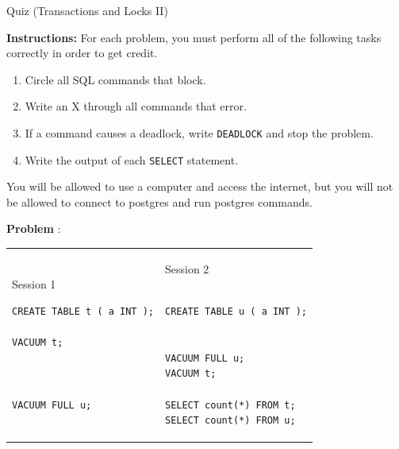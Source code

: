 \documentclass[10pt]{article}
\theoremstyle{definition}
\newcounter{ProblemCounter}
\newcommand{\nextproblem}{\filbreak\stepcounter{ProblemCounter} \noindent\textbf{Problem \theProblemCounter}:}
\begin{document}
\begin{center}
{
\Large
    Quiz (Transactions and Locks II)
}

    \vspace{0.1in}
\end{center}

\noindent
\textbf{Instructions:}
For each problem, you must perform all of the following tasks correctly in order to get credit.
\begin{enumerate}
\item Circle all SQL commands that block.
\item Write an X through all commands that error.
\item If a command causes a deadlock, write \lstinline{DEADLOCK} and stop the problem.
\item Write the output of each \lstinline{SELECT} statement.
\end{enumerate}
    You will be allowed to use a computer and access the internet, but you will not be allowed to connect to postgres and run postgres commands.

\vspace{1in}


\nextproblem
\begin{tcolorbox}
\begin{tabular}{p{3.25in}p{3in}}
\hspace{-0.2in}Session 1
\begin{lstlisting}
CREATE TABLE t ( a INT );

VACUUM t;
  


VACUUM FULL u;

\end{lstlisting}
    &
\hspace{-0.2in}Session 2
\begin{lstlisting}

CREATE TABLE u ( a INT );


VACUUM FULL u;
VACUUM t;

SELECT count(*) FROM t;
SELECT count(*) FROM u;
\end{lstlisting}
\end{tabular}
\end{tcolorbox}
\vspace{0.25in}
\end{document}
